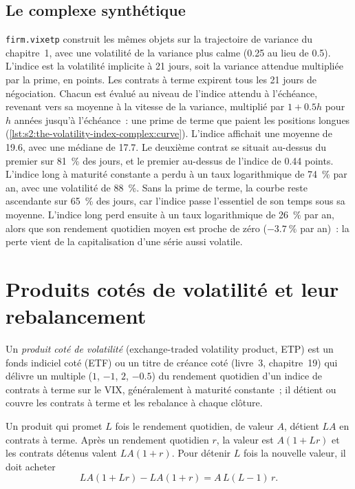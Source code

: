 \subsection*{Le complexe synthétique}

\texttt{firm.vixetp} construit les mêmes objets sur la trajectoire de variance du chapitre~1, avec une volatilité de la variance plus calme (0.25 au lieu de 0.5). L'indice est la
volatilité implicite à 21 jours, soit la variance attendue multipliée par la prime, en points. Les contrats à terme expirent tous les 21 jours de négociation. Chacun est évalué au niveau de l'indice
attendu à l'échéance, revenant vers sa moyenne à la vitesse de la variance, multiplié par $1 + 0.5h$ pour $h$ années jusqu'à l'échéance~: une prime de terme que paient les positions longues
(\cref{lst:s2:the-volatility-index-complex:curve}). L'indice affichait une moyenne de 19.6, avec une médiane de 17.7. Le deuxième contrat se situait au-dessus du premier sur
81~\% des jours, et le premier au-dessus de l'indice de 0.44 points. L'indice long à maturité constante a perdu à un taux logarithmique de 74~\% par an, avec une volatilité de
88~\%. Sans la prime de terme, la courbe reste ascendante sur 65~\% des jours, car l'indice passe l'essentiel de son temps sous sa moyenne. L'indice long
perd ensuite à un taux logarithmique de 26~\% par an, alors que son rendement quotidien moyen est proche de zéro ($-3.7~\%$ par
an)~: la perte vient de la capitalisation d'une série aussi volatile.

\section{Produits cotés de volatilité et leur rebalancement}

\begin{definition}\label{def:s2:the-volatility-index-complex:etp}
Un \emph{produit coté de volatilité} (exchange-traded volatility product, ETP) est un fonds indiciel coté (ETF) ou un titre de créance coté (livre~3, chapitre~19) qui
délivre un multiple ($1$, $-1$, $2$, $-0.5$) du rendement quotidien d'un indice de contrats à terme sur le VIX, généralement à maturité constante~; il détient ou couvre les
contrats à terme et les rebalance à chaque clôture.
\end{definition}

Un produit qui promet $L$ fois le rendement quotidien, de valeur $A$, détient $LA$ en contrats à terme. Après un rendement quotidien $r$, la valeur est $A(1 + Lr)$ et les
contrats détenus valent $LA(1 + r)$. Pour détenir $L$ fois la nouvelle valeur, il doit acheter
\[
LA(1 + Lr) - LA(1 + r) = A\,L(L - 1)\,r.
\]

